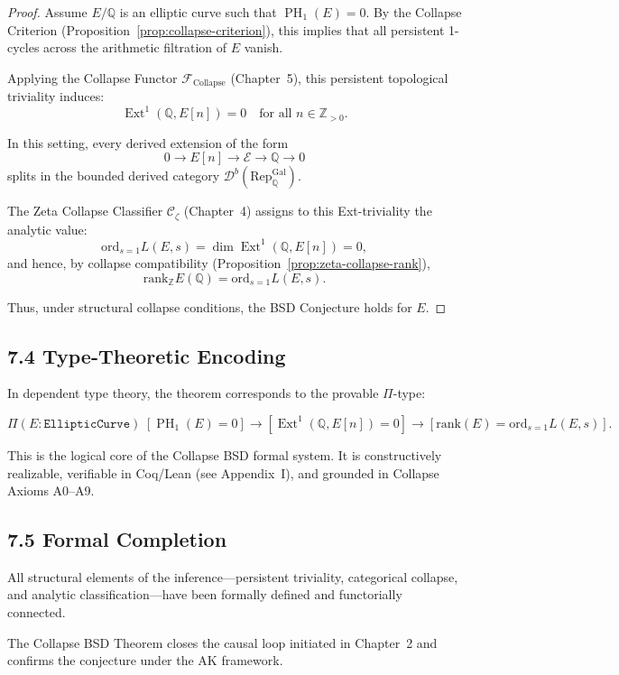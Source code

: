\documentclass[11pt]{article}
\DeclareMathOperator{\Ext}{Ext}
\DeclareMathOperator{\PH}{PH}
\newcommand{\QQ}{\mathbb{Q}}
\newcommand{\ZZ}{\mathbb{Z}}
\begin{document}
\begin{proof}
Assume $E/\QQ$ is an elliptic curve such that $\PH_1(E) = 0$.  
By the Collapse Criterion (Proposition~\ref{prop:collapse-criterion}), this implies that all persistent 1-cycles across the arithmetic filtration of $E$ vanish.

Applying the Collapse Functor $\mathcal{F}_{\mathrm{Collapse}}$ (Chapter~5), this persistent topological triviality induces:
\[
\Ext^1(\QQ,E[n]) = 0 \quad \text{for all } n \in \mathbb{Z}_{>0}.
\]

In this setting, every derived extension of the form
\[
0 \to E[n] \to \mathcal{E} \to \QQ \to 0
\]
splits in the bounded derived category $\mathcal{D}^b(\mathrm{Rep}_{\QQ}^{\text{Gal}})$.

The Zeta Collapse Classifier $\mathcal{C}_\zeta$ (Chapter~4) assigns to this Ext-triviality the analytic value:
\[
\mathrm{ord}_{s=1} L(E,s) = \dim \Ext^1(\QQ,E[n]) = 0,
\]
and hence, by collapse compatibility (Proposition~\ref{prop:zeta-collapse-rank}),
\[
\mathrm{rank}_{\ZZ} E(\QQ) = \mathrm{ord}_{s=1} L(E,s).
\]

Thus, under structural collapse conditions, the BSD Conjecture holds for $E$.
\end{proof}

\subsection{7.4 Type-Theoretic Encoding}

In dependent type theory, the theorem corresponds to the provable $\Pi$-type:

\[
\Pi (E : \texttt{EllipticCurve})\;
[\PH_1(E) = 0] \to [\Ext^1(\QQ,E[n]) = 0] \to [\mathrm{rank}(E) = \mathrm{ord}_{s=1} L(E,s)].
\]

This is the logical core of the Collapse BSD formal system.  
It is constructively realizable, verifiable in Coq/Lean (see Appendix~I), and grounded in Collapse Axioms A0–A9.

\subsection{7.5 Formal Completion}

All structural elements of the inference—persistent triviality, categorical collapse, and analytic classification—have been formally defined and functorially connected.

The Collapse BSD Theorem closes the causal loop initiated in Chapter~2 and confirms the conjecture under the AK framework.
\end{document}
